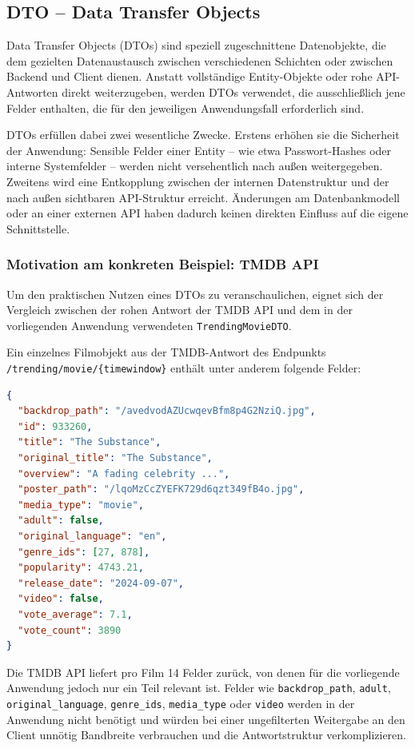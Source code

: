 \subsection{DTO -- Data Transfer Objects}

Data Transfer Objects (DTOs) sind speziell zugeschnittene Datenobjekte, die dem
gezielten Datenaustausch zwischen verschiedenen Schichten oder zwischen Backend und
Client dienen. Anstatt vollständige Entity-Objekte oder rohe API-Antworten direkt
weiterzugeben, werden DTOs verwendet, die ausschließlich jene Felder enthalten,
die für den jeweiligen Anwendungsfall erforderlich sind.

DTOs erfüllen dabei zwei wesentliche Zwecke. Erstens erhöhen sie die Sicherheit
der Anwendung: Sensible Felder einer Entity -- wie etwa Passwort-Hashes oder
interne Systemfelder -- werden nicht versehentlich nach außen weitergegeben.
Zweitens wird eine Entkopplung zwischen der internen Datenstruktur und der nach
außen sichtbaren API-Struktur erreicht. Änderungen am Datenbankmodell oder an
einer externen API haben dadurch keinen direkten Einfluss auf die eigene
Schnittstelle.

\subsubsection*{Motivation am konkreten Beispiel: TMDB API}

Um den praktischen Nutzen eines DTOs zu veranschaulichen, eignet sich der
Vergleich zwischen der rohen Antwort der TMDB API und dem in der vorliegenden
Anwendung verwendeten \texttt{TrendingMovieDTO}.

Ein einzelnes Filmobjekt aus der TMDB-Antwort des Endpunkts
\texttt{/trending/movie/\{timewindow\}} enthält unter anderem folgende Felder:

\begin{lstlisting}[language=json, caption={Auszug einer TMDB API-Antwort für einen Film}]
{
  "backdrop_path": "/avedvodAZUcwqevBfm8p4G2NziQ.jpg",
  "id": 933260,
  "title": "The Substance",
  "original_title": "The Substance",
  "overview": "A fading celebrity ...",
  "poster_path": "/lqoMzCcZYEFK729d6qzt349fB4o.jpg",
  "media_type": "movie",
  "adult": false,
  "original_language": "en",
  "genre_ids": [27, 878],
  "popularity": 4743.21,
  "release_date": "2024-09-07",
  "video": false,
  "vote_average": 7.1,
  "vote_count": 3890
}
\end{lstlisting}

Die TMDB API liefert pro Film 14 Felder zurück, von denen für die vorliegende
Anwendung jedoch nur ein Teil relevant ist. Felder wie \texttt{backdrop\_path},
\texttt{adult}, \texttt{original\_language}, \texttt{genre\_ids},
\texttt{media\_type} oder \texttt{video} werden in der Anwendung nicht benötigt
und würden bei einer ungefilterten Weitergabe an den Client unnötig Bandbreite
verbrauchen und die Antwortstruktur verkomplizieren.

